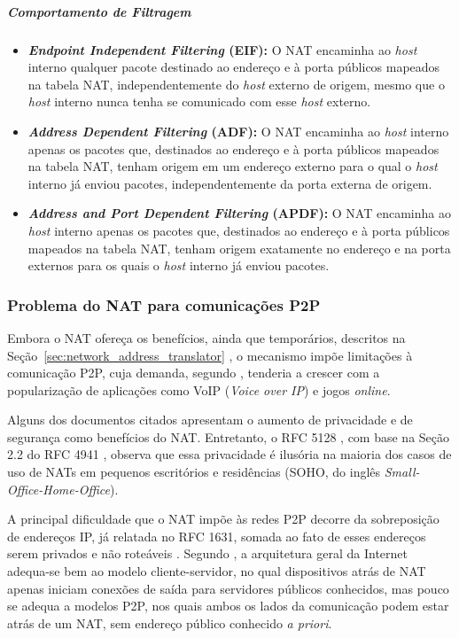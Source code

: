 \subparagraph{Comportamento de Filtragem}

\begin{itemize}
    \item \textbf{\textit{Endpoint Independent Filtering} (EIF):} O NAT encaminha ao \textit{host} interno qualquer pacote destinado ao endereço e à porta públicos mapeados na tabela NAT, independentemente do \textit{host} externo de origem, mesmo que o \textit{host} interno nunca tenha se comunicado com esse \textit{host} externo.
    \item \textbf{\textit{Address Dependent Filtering} (ADF):} O NAT encaminha ao \textit{host} interno apenas os pacotes que, destinados ao endereço e à porta públicos mapeados na tabela NAT, tenham origem em um endereço externo para o qual o \textit{host} interno já enviou pacotes, independentemente da porta externa de origem.
    \item \textbf{\textit{Address and Port Dependent Filtering} (APDF):} O NAT encaminha ao \textit{host} interno apenas os pacotes que, destinados ao endereço e à porta públicos mapeados na tabela NAT, tenham origem exatamente no endereço e na porta externos para os quais o \textit{host} interno já enviou pacotes.
\end{itemize}

\subsubsection{Problema do NAT para comunicações P2P}
\label{sec:nat_problem_for_p2p_communication}

Embora o NAT ofereça os benefícios, ainda que temporários, descritos na Seção~\ref{sec:network_address_translator} \citep{RFC1631}, o mecanismo impõe limitações à comunicação P2P, cuja demanda, segundo \citep{ford2005peer}, tenderia a crescer com a popularização de aplicações como VoIP (\textit{Voice over IP}) e jogos \textit{online}.

Alguns dos documentos citados apresentam o aumento de privacidade e de segurança como benefícios do NAT. Entretanto, o RFC 5128 \citep{rfc5128}, com base na Seção 2.2 do RFC 4941 \citep{RFC4941}, observa que essa privacidade é ilusória na maioria dos casos de uso de NATs em pequenos escritórios e residências (SOHO, do inglês \textit{Small-Office-Home-Office}).

A principal dificuldade que o NAT impõe às redes P2P decorre da sobreposição de endereços IP, já relatada no RFC 1631, somada ao fato de esses endereços serem privados e não roteáveis \citep{ford2005peer}. Segundo \citep{ford2005peer}, a arquitetura geral da Internet adequa-se bem ao modelo cliente-servidor, no qual dispositivos atrás de NAT apenas iniciam conexões de saída para servidores públicos conhecidos, mas pouco se adequa a modelos P2P, nos quais ambos os lados da comunicação podem estar atrás de um NAT, sem endereço público conhecido \textit{a priori}.

